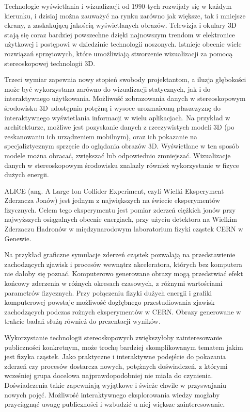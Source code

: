 Technologie wyświetlania i wizualizacji od 1990-tych rozwijały się w każdym kierunku, i dzisiaj można zauważyć na rynku zarówno jak większe, tak i mniejsze ekrany, z zaskakującą jakością wyświetlanych obrazów. Telewizja i okulary 3D stają się coraz bardziej powszechne dzięki najnowszym trendom w elektronice użytkowej i postępowi w dziedzinie technologii noszonych. Istnieje obecnie wiele rozwiązań sprzętowych, które umożliwiają stworzenie wizualizacji za pomocą stereoskopowej technologii 3D. 

Trzeci wymiar zapewnia nowy stopień swobody projektantom, a iluzja głębokości może być wykorzystana zarówno do wizualizacji statycznych, jak i do interaktywnego użytkowania. Możliwość zobrazowania danych w stereoskopowym środowisku 3D udostępnia potężną i wysoce urozmaiconą płaszczyznę do interaktywnego wyświetlania informacji w wielu aplikacjach. Na przykład w architekturze, możliwe jest pozyskanie danych z rzeczywistych modeli 3D (po zeskanowaniu ich urządzeniem mobilnym), oraz ich pokazanie na specjaliztycznym sprzęcie do oglądania obrazów 3D. Wyświetlane w ten sposób modele można obracać, zwiększać lub odpowiednio zmniejszać. Wizualizacje danych w stereoskopowym środowisku znalazły również wykorzystanie w fizyce dużych energii. 

ALICE (ang. A Large Ion Collider Experiment, czyli Wielki Eksperyment Zderzacza Jonów) jest jednym z największych na świecie eksperymentów fizycznych. Celem tego eksperymentu jest pomiar zderzeń ciężkich jonów przy najwyższych osiągalnych obecnie energiach, przy użyciu detektora na Wielkim Zderzaczu Hadronów w międzynarodowym laboratorium fizyki cząstek CERN w Genewie. 

Na przykład graficzne symulacje zderzeń cząstek pozwalają na przedstawienie zachodzących zjawisk i procesów wewnątrz akceleratora, których bez komputera nie dałoby się poznać. Komputerowo generowane obrazy mogą przedstwiać efekt końcowy zderzenia w różnych okresach czasowych, z różnymi wartościami parametrów fizycznych. Przy połączeniu fizyki dużych energii i grafiki komputerowej powstaje możliwość dogłębnego przestudiowania zjawisk zachodzących podczas rożnych eksperymentów w CERN. Obrazy generowane w trakcie badań służą również do prezentacji wyników.

Wykorzystanie technologii stereoskopowych zwiększyłoby zainteresowanie publiczności konkretnym, może trochę bardziej skomplikowanym tematem jakim jest fizyka cząstek. Jako praktyczne i interaktywne podejście do pokazania zderzeń czy procesów dostarcza nowych, potężnych doświadczeń, z którymi wcześniej grupa docelowa najprawdopodobniej nie miała do czynienia. Doświadczenia takie zapewniają wyjątkowe i świeże chwile w przyswajaniu nowych pojęć. Możliwość interaktywnego eksplorowania wiedzy mogłaby przyciągnąć uwagę publiczności i wzbudzić u niej większe zainteresowanie. 


